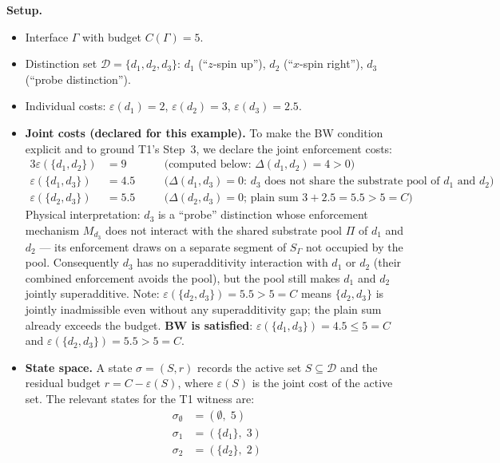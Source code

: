 \documentclass[11pt]{article}
\theoremstyle{remark}
\begin{document}
\textbf{Setup.}
\begin{itemize}[nosep,leftmargin=2em,itemsep=2pt]
  \item Interface $\Gamma$ with budget $C(\Gamma) = 5$.
  \item Distinction set $\mathcal{D} = \{d_1, d_2, d_3\}$:
    $d_1$ (``$z$-spin up''), $d_2$ (``$x$-spin right''), $d_3$ (``probe distinction'').
  \item Individual costs: $\varepsilon(d_1) = 2$, $\varepsilon(d_2) = 3$,
    $\varepsilon(d_3) = 2.5$.
  \item \textbf{Joint costs (declared for this example).}  To make the BW condition explicit and to ground T1's Step~3, we declare the joint enforcement costs:
    \begin{alignat*}{3}
      \varepsilon(\{d_1,d_2\}) &= 9 &\quad& \text{(computed below: $\Delta(d_1,d_2) = 4 > 0$)}\\
      \varepsilon(\{d_1,d_3\}) &= 4.5 &\quad& \text{($\Delta(d_1,d_3) = 0$: $d_3$ does not share the substrate pool of $d_1$ and $d_2$)}\\
      \varepsilon(\{d_2,d_3\}) &= 5.5 &\quad& \text{($\Delta(d_2,d_3) = 0$; plain sum $3+2.5 = 5.5 > 5 = C$)}
    \end{alignat*}
    Physical interpretation: $d_3$ is a ``probe'' distinction whose enforcement mechanism $M_{d_3}$ does not interact with the shared substrate pool $\Pi$ of $d_1$ and $d_2$ --- its enforcement draws on a separate segment of $S_\Gamma$ not occupied by the pool.  Consequently $d_3$ has no superadditivity interaction with $d_1$ or $d_2$ (their combined enforcement avoids the pool), but the pool still makes $d_1$ and $d_2$ jointly superadditive.  Note: $\varepsilon(\{d_2,d_3\}) = 5.5 > 5 = C$ means $\{d_2,d_3\}$ is jointly inadmissible even without any superadditivity gap; the plain sum already exceeds the budget.  \textbf{BW is satisfied}: $\varepsilon(\{d_1,d_3\}) = 4.5 \le 5 = C$ and $\varepsilon(\{d_2,d_3\}) = 5.5 > 5 = C$.
  \item \textbf{State space.}  A state $\sigma = (S, r)$ records the
    active set $S \subseteq \mathcal{D}$ and the residual budget
    $r = C - \varepsilon(S)$, where $\varepsilon(S)$ is the joint cost of the active set.  The relevant states for the T1 witness are:
    \begin{align*}
      \sigma_\emptyset &= (\emptyset,\; 5) \\
      \sigma_1 &= (\{d_1\},\; 3) \\
      \sigma_2 &= (\{d_2\},\; 2) \\

\end{align*}
\end{itemize}
\end{document}
